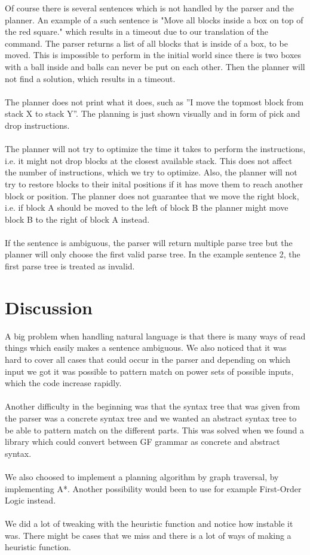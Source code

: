 Of course there is several sentences which is not handled by the parser and the planner. An example of a such sentence is "Move all blocks inside a box on top of the red square." which results in a timeout due to our translation of the command. The parser returns a list of all blocks that is inside of a box, to be moved. This is impossible to perform in the initial world since there is two boxes with a ball inside and balls can never be put on each other. Then the planner will not find a solution, which results in a timeout.\\\\
The planner does not print what it does, such as ''I move the topmost block from stack X to stack Y''. The planning is just shown visually and in form of pick and drop instructions. \\\\
The planner will not try to optimize the time it takes to perform the instructions, i.e. it might not drop blocks at the closest available stack. This does not affect the number of instructions, which we try to optimize. Also, the planner will not try to restore blocks to their inital positions if it has move them to reach another block or position. The planner does not guarantee that we move the right block, i.e. if block A should be moved to the left of block B the planner might move block B to the right of block A instead. 
\\\\
If the sentence is ambiguous, the parser will return multiple parse tree but the planner will only choose the first valid parse tree. In the example sentence 2, the first parse tree is treated as invalid.

\newpage
\section{Discussion}
A big problem when handling natural language is that there is many ways of read things which easily makes a sentence ambiguous. We also noticed that it was hard to cover all cases that could occur in the parser and depending on which input we got it was possible to pattern match on power sets of possible inputs, which the code increase rapidly. \\\\
Another difficulty in the beginning was that the syntax tree that was given from the parser was a concrete syntax tree and we wanted an abstract syntax tree to be able to pattern match on the different parts. This was solved when we found a library which could convert between GF grammar as concrete and abstract syntax. \\\\
We also choosed to implement a planning algorithm by graph traversal, by implementing A*. Another possibility would been to use for example First-Order Logic instead. 
\\\\
We did a lot of tweaking with the heuristic function and notice how instable it was. There might be cases that we miss and there is a lot of ways of making a heuristic function.
